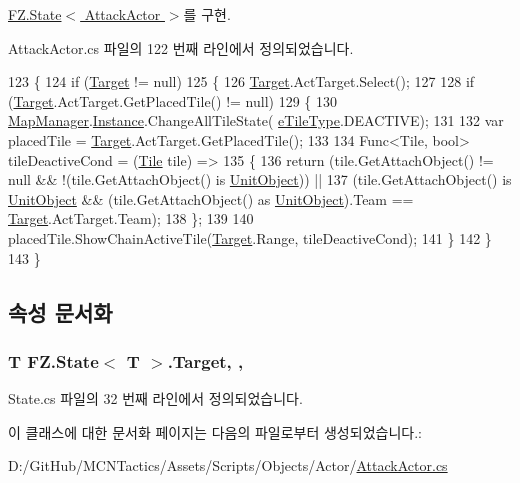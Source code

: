 \hyperlink{class_f_z_1_1_state_acaf1584680a2e69e2a4da20574723981}{F\+Z.\+State$<$ Attack\+Actor $>$}를 구현.



Attack\+Actor.\+cs 파일의 122 번째 라인에서 정의되었습니다.


\begin{DoxyCode}
123         \{
124             \textcolor{keywordflow}{if} (\hyperlink{class_f_z_1_1_state_a6927f5c9f2517052f9dc5596188e9d95}{Target} != null)
125             \{
126                 \hyperlink{class_f_z_1_1_state_a6927f5c9f2517052f9dc5596188e9d95}{Target}.ActTarget.Select();
127 
128                 \textcolor{keywordflow}{if} (\hyperlink{class_f_z_1_1_state_a6927f5c9f2517052f9dc5596188e9d95}{Target}.ActTarget.GetPlacedTile() != null)
129                 \{
130                     \hyperlink{class_map_manager}{MapManager}.\hyperlink{class_f_z_1_1_mono_singletone_a39e34129d25a9664576949259e7dfd5f}{Instance}.ChangeAllTileState(
      \hyperlink{_tile_8cs_a271bc07be325bca511bcb747e0ff2fda}{eTileType}.DEACTIVE);
131 
132                     var placedTile = \hyperlink{class_f_z_1_1_state_a6927f5c9f2517052f9dc5596188e9d95}{Target}.ActTarget.GetPlacedTile();
133 
134                     Func<Tile, bool> tileDeactiveCond = (\hyperlink{class_tile}{Tile} tile) =>
135                     \{
136                         \textcolor{keywordflow}{return} (tile.GetAttachObject() != null && !(tile.GetAttachObject() is 
      \hyperlink{class_unit_object}{UnitObject})) ||
137                                (tile.GetAttachObject() is \hyperlink{class_unit_object}{UnitObject} && (tile.GetAttachObject() 
      as \hyperlink{class_unit_object}{UnitObject}).Team == \hyperlink{class_f_z_1_1_state_a6927f5c9f2517052f9dc5596188e9d95}{Target}.ActTarget.Team);
138                     \};
139 
140                     placedTile.ShowChainActiveTile(\hyperlink{class_f_z_1_1_state_a6927f5c9f2517052f9dc5596188e9d95}{Target}.Range, tileDeactiveCond);
141                 \}
142             \}
143         \}
\end{DoxyCode}


\subsection{속성 문서화}
\subsubsection[{\texorpdfstring{Target}{Target}}]{\setlength{\rightskip}{0pt plus 5cm}T {\bf F\+Z.\+State}$<$ T $>$.Target\hspace{0.3cm}{\ttfamily [get]}, {\ttfamily [protected]}, {\ttfamily [inherited]}}\hypertarget{class_f_z_1_1_state_a6927f5c9f2517052f9dc5596188e9d95}{}\label{class_f_z_1_1_state_a6927f5c9f2517052f9dc5596188e9d95}


State.\+cs 파일의 32 번째 라인에서 정의되었습니다.



이 클래스에 대한 문서화 페이지는 다음의 파일로부터 생성되었습니다.\+:\begin{DoxyCompactItemize}
\item 
D\+:/\+Git\+Hub/\+M\+C\+N\+Tactics/\+Assets/\+Scripts/\+Objects/\+Actor/\hyperlink{_attack_actor_8cs}{Attack\+Actor.\+cs}\end{DoxyCompactItemize}
